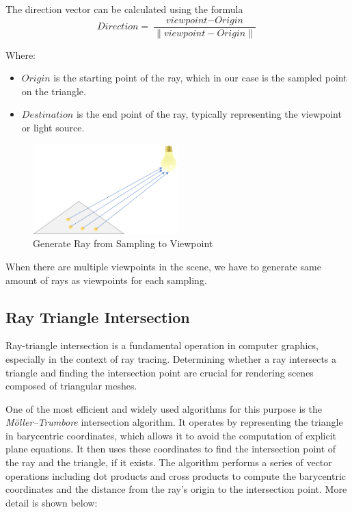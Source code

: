 \documentclass[11pt, a4paper,oneside,chapterprefix=false]{scrbook}
\begin{document}
\vspace{10pt}

The direction vector can be calculated using the formula 
\[
\textit{Direction} = \frac{\textit{viewpoint} - \textit{Origin}}{\|\textit{viewpoint} - \textit{Origin}\|}
\]

Where:
\begin{itemize}
    \item \(\textit{Origin}\) is the starting point of the ray, which in our case is the sampled point on the triangle.
    \item \(\textit{Destination}\) is the end point of the ray, typically representing the viewpoint or light source.
\end{itemize}

\begin{figure}[H]
    \centering
    \includegraphics*[width=0.5\textwidth]{figures/sample to vp.png}
    \caption{Generate Ray from Sampling to Viewpoint}
    \label{fig:generate ray from sampling to viewpoint}
\end{figure}

When there are multiple viewpoints in the scene, we have to generate same amount of rays as viewpoints for each sampling.  

\subsection{Ray Triangle Intersection}

Ray-triangle intersection is a fundamental operation in computer graphics, especially in the context of ray tracing. Determining whether a ray intersects a triangle and finding the intersection point are crucial for rendering scenes composed of triangular meshes.
\vspace{10pt}

One of the most efficient and widely used algorithms for this purpose is the \textit{Möller–Trumbore} intersection algorithm. It operates by representing the triangle in barycentric coordinates, which allows it to avoid the computation of explicit plane equations. It then uses these coordinates to find the intersection point of the ray and the triangle, if it exists. The algorithm performs a series of vector operations including dot products and cross products to compute the barycentric coordinates and the distance from the ray's origin to the intersection point. More detail is shown below:
\end{document}
